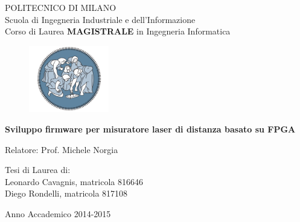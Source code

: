 \thispagestyle{empty}
\vspace*{-1.5cm} \bfseries{
\begin{center}
  \large
  POLITECNICO DI MILANO\\
  \normalsize
  Scuola di Ingegneria Industriale e dell'Informazione\\
  Corso di Laurea \textbf{MAGISTRALE} in Ingegneria Informatica\\
  \begin{figure}[htbp]
    \begin{center}
      \includegraphics[width=3.5cm]{./pictures/frontesp/newlogopm1}
    \end{center}
  \end{figure}
  \vspace*{0.3cm} \LARGE



  \textbf{Sviluppo firmware per misuratore laser di distanza basato su FPGA}\\



  \vspace*{.75truecm} \large
\end{center}
\vspace*{3.0cm} \large
\begin{flushleft}


  Relatore: Prof. Michele Norgia

\end{flushleft}
\vspace*{1.0cm}
\begin{flushright}


  Tesi di Laurea di:\\ Leonardo Cavagnis, matricola 816646 \\ 
		       Diego Rondelli, matricola 817108 \\


\end{flushright}
\vspace*{0.5cm}
\begin{center}



  Anno Accademico 2014-2015
\end{center} \clearpage
}
